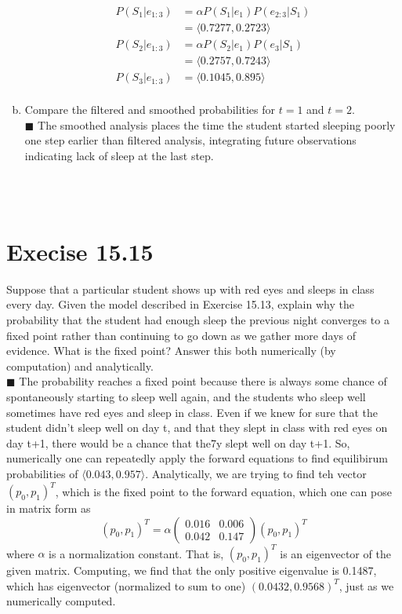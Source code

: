 \documentclass{article}
\newcommand{\solution}[1]{~\\ $\blacksquare$ \sffamily\upshape\selectfont #1
\normalfont ~\\~ }
\begin{document}
\begin{enumerate}[a.]
{\begin{align*}
    P(S_1|e_{1:3}) & = \alpha P(S_1|e_1)P(e_{2:3}|S_1) \\ 
    & = \langle 0.7277, 0.2723 \rangle \\ 
    P(S_2|e_{1:3}) & = \alpha P(S_2|e_1)P(e_3|S_1) \\ 
    & = \langle 0.2757, 0.7243 \rangle \\
    P(S_3|e_{1:3}) & = \langle 0.1045, 0.895 \rangle \\
  \end{align*}
}
\item Compare the filtered and smoothed probabilities for $t = 1$ and
  $t = 2$.
\solution{
  The smoothed analysis places the time the student started sleeping
  poorly one step earlier than filtered analysis, integrating future
  observations indicating lack of sleep at the last step. 
}
\end{enumerate}

\section{Execise 15.15}
Suppose that a particular student shows up with red eyes and sleeps in
class every day. Given the model described in Exercise 15.13, explain
why the probability that the student had enough sleep the previous
night converges to a fixed point rather than continuing to go down as
we gather more days of evidence. What is the fixed point? Answer this
both numerically (by computation) and analytically.
\solution{
  The probability reaches a fixed point because there is always some
  chance of spontaneously starting to sleep well again, and the
  students who sleep well sometimes have red eyes and sleep in
  class. Even if we knew for sure that the student didn't sleep well
  on day t, and that they slept in class with red eyes on day t+1,
  there would be a chance that the7y slept well on day t+1. 
  So, numerically one can repeatedly apply the forward equations to
  find equilibirum probabilities of $\langle 0.043, 0.957\rangle$. 
  Analytically, we are trying to  find teh vector $(p_0,p_1)^T$, which
  is the fixed point to the forward equation, which one can pose in
  matrix form as 
  \[(p_0,p_1)^T = \alpha \begin{pmatrix} 0.016 & 0.006 \\ 0.042 &
   0.147 \end{pmatrix} (p_0,p_1)^T\]
  where $\alpha$ is a normalization constant. That is, $(p_0,p_1)^T$ is
  an eigenvector of the given matrix. Computing, we find that  the only
  positive eigenvalue is 0.1487, which has eigenvector (normalized to
  sum to one) $(0.0432,0.9568)^T$, just as we numerically computed. 
}
\end{document}

